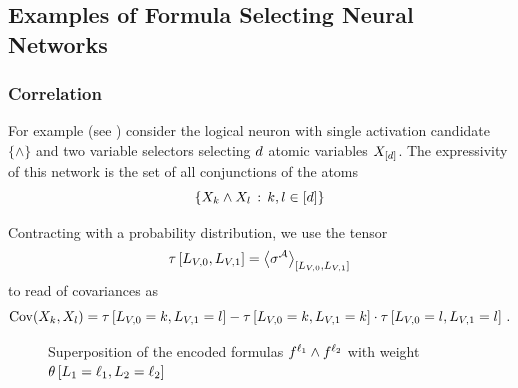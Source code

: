 \subsection{Examples of Formula Selecting Neural Networks}



\subsubsection{Correlation}

For example (see ) consider the logical neuron with single activation candidate $\{\land\}$ and two variable selectors selecting $d$ atomic variables $X_{[d]}$.
The expressivity of this network is the set of all conjunctions of the atoms
\[ \{X_{k} \land X_{l} \,:\, k,l\in[d] \} \]


Contracting with a probability distribution, we use the tensor
\[ \tau\left[L_{V,0},L_{V,1}\right] = \left\langle \sigma^{\mathcal{A}}\right\rangle_{\left[ L_{V,0},L_{V,1} \right]} \]
to read of covariances as
\[ \mathrm{Cov}(X_{k},X_{l}) = \tau\left[L_{V,0}=k,L_{V,1}=l\right]  -
\tau\left[L_{V,0}=k,L_{V,1}=k\right]  \cdot \tau\left[L_{V,0}=l,L_{V,1}=l\right] \, .  \]



\begin{figure}[t]
    \begin{center}
        
    \end{center}
    \caption{Superposition of the encoded formulas ${f^{\ell_{1}} \land f^{\ell_{2}}}$ with weight $\theta\left[L_{1}=\ell_{1},L_{2}=\ell_{2}\right]$}
    \label{fig:AndSupFTDecomposition}
\end{figure}




